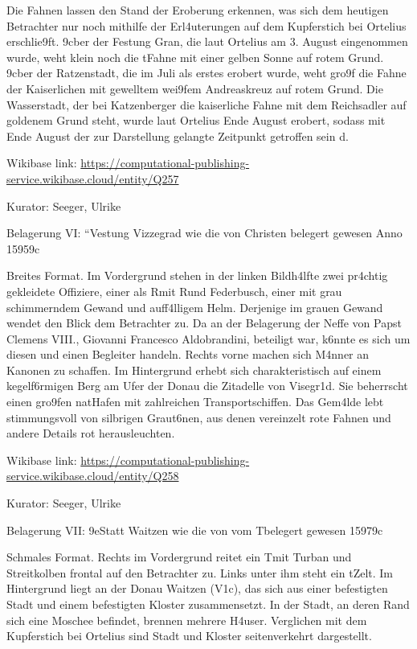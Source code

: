 \documentclass[
  letterpaper,
]{book}
\begin{document}
Die Fahnen lassen den Stand der Eroberung erkennen, was sich dem
heutigen Betrachter nur noch mithilfe der Erl\xa4uterungen auf dem
Kupferstich bei Ortelius erschlie\x9ft. \x9cber der Festung
Gran, die laut Ortelius am 3. August eingenommen wurde, weht klein noch
die t\xbcrkische Fahne mit einer gelben Sonne auf rotem Grund.
\x9cber der Ratzenstadt, die im Juli als erstes erobert wurde, weht
gro\x9f die Fahne der Kaiserlichen mit gewelltem wei\x9fem
Andreaskreuz auf rotem Grund. Die Wasserstadt, \xbcber der bei
Katzenberger die kaiserliche Fahne mit dem Reichsadler auf goldenem
Grund steht, wurde laut Ortelius Ende August erobert, sodass mit Ende
August der zur Darstellung gelangte Zeitpunkt getroffen sein
d\xbcrfte.

Wikibase link:
\url{https://computational-publishing-service.wikibase.cloud/entity/Q257}

Kurator: Seeger, Ulrike

Belagerung VI: ``Vestung Vizzegrad wie die von Christen belegert gewesen
Anno 1595\x9c

Breites Format. Im Vordergrund stehen in der linken Bildh\xa4lfte
zwei pr\xa4chtig gekleidete Offiziere, einer als
R\xbcckenfigur mit R\xbcstung und Federbusch, einer mit grau
schimmerndem Gewand und auff\xa4lligem Helm. Derjenige im grauen
Gewand wendet den Blick dem Betrachter zu. Da an der Belagerung der
Neffe von Papst Clemens VIII., Giovanni Francesco Aldobrandini,
beteiligt war, k\xb6nnte es sich um diesen und einen Begleiter
handeln. Rechts vorne machen sich M\xa4nner an Kanonen zu schaffen.
Im Hintergrund erhebt sich charakteristisch auf einem
kegelf\xb6rmigen Berg am Ufer der Donau die Zitadelle von
Visegr\xa1d. Sie beherrscht einen gro\x9fen
nat\xbcrlichen Hafen mit zahlreichen Transportschiffen. Das
Gem\xa4lde lebt stimmungsvoll von silbrigen Graut\xb6nen, aus
denen vereinzelt rote Fahnen und andere Details rot herausleuchten.

Wikibase link:
\url{https://computational-publishing-service.wikibase.cloud/entity/Q258}

Kurator: Seeger, Ulrike

Belagerung VII: \x9eStatt Waitzen wie die von vom
T\xbcrcken belegert gewesen 1597\x9c

Schmales Format. Rechts im Vordergrund reitet ein T\xbcrke mit
Turban und Streitkolben frontal auf den Betrachter zu. Links unter ihm
steht ein t\xbcrkisches Zelt. Im Hintergrund liegt an der Donau
Waitzen (V\xa1c), das sich aus einer befestigten Stadt und einem
befestigten Kloster zusammensetzt. In der Stadt, an deren Rand sich eine
Moschee befindet, brennen mehrere H\xa4user. Verglichen mit dem
Kupferstich bei Ortelius sind Stadt und Kloster seitenverkehrt
dargestellt.
\end{document}
